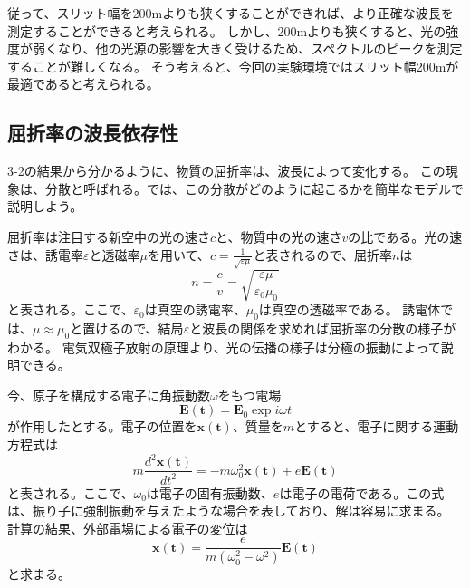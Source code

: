 \documentclass[a4paper,10pt]{jsarticle}
\begin{document}
\begin{multicols}{2}
従って、スリット幅を200\textmu mよりも狭くすることができれば、より正確な波長を測定することができると考えられる。
しかし、200\textmu mよりも狭くすると、光の強度が弱くなり、他の光源の影響を大きく受けるため、スペクトルのピークを測定することが難しくなる。
そう考えると、今回の実験環境ではスリット幅200\textmu mが最適であると考えられる。

\subsection{屈折率の波長依存性}
3-2の結果から分かるように、物質の屈折率は、波長によって変化する。
この現象は、分散と呼ばれる。では、この分散がどのように起こるかを簡単なモデルで説明しよう。

屈折率は注目する新空中の光の速さ$c$と、物質中の光の速さ$v$の比である。光の速さは、誘電率$\varepsilon$と透磁率$\mu$を用いて、$c = \frac{1}{\sqrt{\varepsilon \mu}}$と表されるので、屈折率$n$は
\begin{equation}
  n = \frac{c}{v} = \sqrt{\frac{\varepsilon \mu}{\varepsilon_0 \mu_0}}
\end{equation}
と表される。ここで、$\varepsilon_0$は真空の誘電率、$\mu_0$は真空の透磁率である。
誘電体では、$\mu\approx\mu_0$と置けるので、結局$\varepsilon$と波長の関係を求めれば屈折率の分散の様子がわかる。
電気双極子放射の原理より、光の伝播の様子は分極の振動によって説明できる。

今、原子を構成する電子に角振動数$\omega$をもつ電場
\begin{equation}
  \bm{E(t)} = \bm{E}_0 \exp{i\omega t}
\end{equation}
 が作用したとする。電子の位置を$\bm{x(t)}$、質量を$m$とすると、電子に関する運動方程式は
\begin{equation}
  m\frac{d^2\bm{x(t)}}{dt^2} = -m\omega_0^2\bm{x(t)} + e\bm{E(t)}
\end{equation}
と表される。ここで、$\omega_0$は電子の固有振動数、$e$は電子の電荷である。この式は、振り子に強制振動を与えたような場合を表しており、解は容易に求まる。
計算の結果、外部電場による電子の変位は
\begin{equation}
  \bm{x(t)} = \frac{e}{m(\omega_0^2 - \omega^2)}\bm{E(t)}
\end{equation}
と求まる。


\end{multicols}
\end{document}
